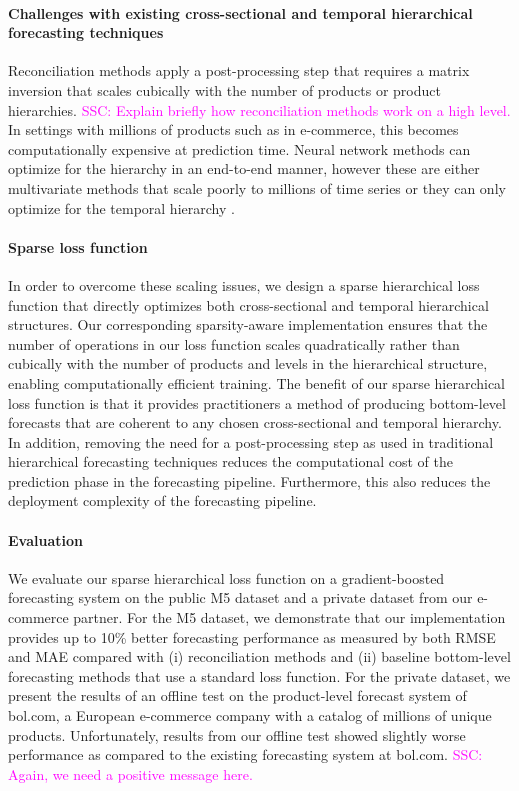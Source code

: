 \documentclass[preprint, 3p, times, twocolumn]{elsarticle}
\newcommand{\ssc}[1]{\textcolor{magenta}{SSC: #1.}}
\begin{document}
\paragraph{Challenges with existing cross-sectional and temporal hierarchical forecasting techniques} Reconciliation methods \cite{hyndman_optimal_2011,athanasopoulos_forecasting_2017,wickramasuriya_optimal_2019} apply a post-processing step that requires a matrix inversion that scales cubically with the number of products or product hierarchies. \ssc{Explain briefly how reconciliation methods work on a high level} In settings with millions of products such as in e-commerce, this becomes computationally expensive at prediction time. Neural network methods can optimize for the hierarchy in an end-to-end manner, however these are either multivariate methods that scale poorly to millions of time series \cite{rangapuram_endtoend_2021} or they can only optimize for the temporal hierarchy \cite{rangapuram_coherent_2023}.
  
\paragraph{Sparse loss function} In order to overcome these scaling issues, we design a sparse hierarchical loss function that directly optimizes both cross-sectional and temporal hierarchical structures. Our corresponding sparsity-aware implementation ensures that the number of operations in our loss function scales quadratically rather than cubically with the number of products and levels in the hierarchical structure, enabling computationally efficient training. The benefit of our sparse hierarchical loss function is that it provides practitioners a method of producing bottom-level forecasts that are coherent to any chosen cross-sectional and temporal hierarchy. In addition, removing the need for a post-processing step as used in traditional hierarchical forecasting techniques reduces the computational cost of the prediction phase in the forecasting pipeline. Furthermore, this also reduces the deployment complexity of the forecasting pipeline.

\paragraph{Evaluation} We evaluate our sparse hierarchical loss function on a gradient-boosted forecasting system on the public M5 dataset \cite{makridakis_m5_2022} and a private dataset from our e-commerce partner. For the M5 dataset, we demonstrate that our implementation provides up to 10\% better forecasting performance as measured by both RMSE and MAE compared with (i) reconciliation methods and (ii) baseline bottom-level forecasting methods that use a standard loss function. For the private dataset, we present the results of an offline test on the product-level forecast system of bol.com, a European e-commerce company with a catalog of millions of unique products. Unfortunately, results from our offline test showed slightly worse performance as compared to the existing forecasting system at bol.com. \ssc{Again, we need a positive message here}
\end{document}
